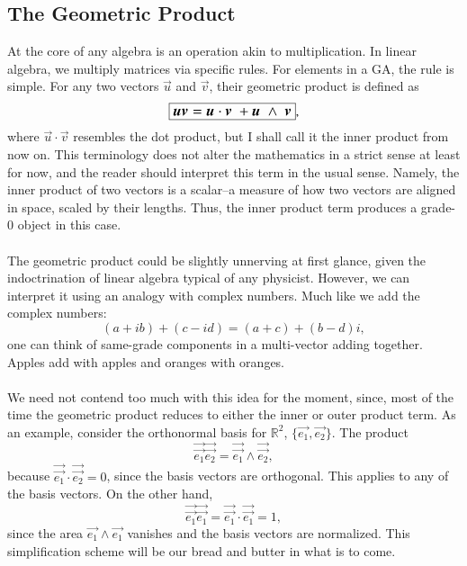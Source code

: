 \subsection{The Geometric Product}

At the core of any algebra is an operation akin to multiplication. In linear algebra, we multiply matrices via specific rules. For elements in a GA, the rule is simple. For any two vectors $\vec{u}$ and $\vec{v}$, their geometric product is defined as
\begin{equation}
    \large \boxed{\vec{u} \vec{v} = \vec{u} \cdot \vec{v} \ + \vec{u} \ \wedge  \ \vec{v} },
\end{equation}
where $\vec{u} \cdot \vec{v}$ resembles the dot product, but I shall call it the inner product from now on. This terminology does not alter the mathematics in a strict sense at least for now, and the reader should interpret this term in the usual sense. Namely, the inner product of two vectors is a scalar--a measure of how two vectors are aligned in space, scaled by their lengths. Thus, the inner product term produces a grade-0 object in this case. 
\\ \\
The geometric product could be slightly unnerving at first glance, given the indoctrination of linear algebra typical of any physicist. However, we can interpret it using an analogy with complex numbers. Much like we add the complex numbers: 
$$ (a + ib) + (c -id) = (a+c) + (b-d)i , $$
one can think of same-grade components in a multi-vector adding together. Apples add with apples and oranges with oranges.
\\ \\
We need not contend too much with this idea for the moment, since, most of the time the geometric product reduces to either the inner or outer product term. As an example, consider the orthonormal basis for $\mathbb{R}^2$, $\{ \vec{e_1}, \vec{e_2}\}$. The product 
\begin{equation}
   \vec{\vec{e_1}} \vec{\vec{e_2}} = \vec{\vec{e_1}} \wedge \vec{\vec{e_2}},  
\end{equation}
because $\vec{\vec{e_1}} \cdot \vec{\vec{e_2}} = 0$, since the basis vectors are orthogonal. This applies to any of the basis vectors. On the other hand,
\begin{equation}
   \vec{\vec{e_1}} \vec{\vec{e_1}} = \vec{\vec{e_1}} \cdot \vec{\vec{e_1}} = 1, 
\end{equation}
since the area $ \vec{e_1} \wedge \vec{e_1}$ vanishes and the basis vectors are normalized. This simplification scheme will be our bread and butter in what is to come.